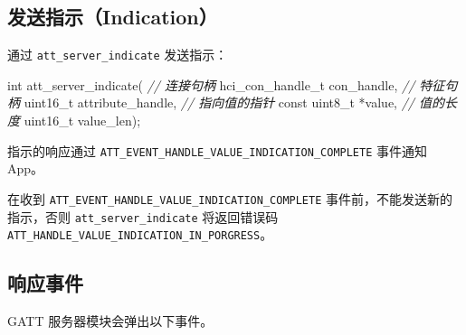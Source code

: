 \documentclass[
  12pt,
]{book}
\makeatletter
\newenvironment{Shaded}{\begin{snugshade}}{\end{snugshade}}
\newcommand{\CommentTok}[1]{\textcolor[rgb]{0.56,0.35,0.01}{\textit{#1}}}
\newcommand{\DataTypeTok}[1]{\textcolor[rgb]{0.13,0.29,0.53}{#1}}
\newcommand{\NormalTok}[1]{#1}
\newenvironment{kframe}{%
\medskip{}
\setlength{\fboxsep}{.8em}
 \def\at@end@of@kframe{}%
 \ifinner\ifhmode%
  \def\at@end@of@kframe{\end{minipage}}%
  \begin{minipage}{\columnwidth}%
 \fi\fi%
 \def\FrameCommand##1{\hskip\@totalleftmargin \hskip-\fboxsep
 \colorbox{shadecolor}{##1}\hskip-\fboxsep
     \hskip-\linewidth \hskip-\@totalleftmargin \hskip\columnwidth}%
 \MakeFramed {\advance\hsize-\width
   \@totalleftmargin\z@ \linewidth\hsize
   \@setminipage}}%
 {\par\unskip\endMakeFramed%
 \at@end@of@kframe}
\newenvironment{rmdblock}[1]
  {
  \begin{itemize}
  \renewcommand{\labelitemi}{
    \raisebox{-.7\height}[0pt][0pt]{
      {\setkeys{Gin}{width=3em,keepaspectratio}\texttt{[image: images/\#1]}}
    }
  }
  \setlength{\fboxsep}{1em}
  \begin{kframe}
  \item
  }
  {
  \end{kframe}
  \end{itemize}
  }
\newenvironment{rmdcaution}
  {\begin{rmdblock}{caution}}
  {\end{rmdblock}}
\makeatother
\begin{document}
\hypertarget{ux53d1ux9001ux6307ux793aindication}{%
\subsection{发送指示（Indication）}\label{ux53d1ux9001ux6307ux793aindication}}

通过 \texttt{att\_server\_indicate} 发送指示：

\begin{Shaded}
\begin{Highlighting}[]
\DataTypeTok{int}\NormalTok{ att_server_indicate(}
  \CommentTok{// 连接句柄}
\NormalTok{  hci_con_handle_t con_handle,}
  \CommentTok{// 特征句柄}
  \DataTypeTok{uint16_t}\NormalTok{ attribute_handle,}
  \CommentTok{// 指向值的指针}
  \DataTypeTok{const} \DataTypeTok{uint8_t}\NormalTok{ *value,}
  \CommentTok{// 值的长度}
  \DataTypeTok{uint16_t}\NormalTok{ value_len);}
\end{Highlighting}
\end{Shaded}

指示的响应通过 \texttt{ATT\_EVENT\_HANDLE\_VALUE\_INDICATION\_COMPLETE} 事件通知 App。

\begin{rmdcaution}
在收到 \texttt{ATT\_EVENT\_HANDLE\_VALUE\_INDICATION\_COMPLETE}
事件前，不能发送新的指示，否则 \texttt{att\_server\_indicate}
将返回错误码 \texttt{ATT\_HANDLE\_VALUE\_INDICATION\_IN\_PORGRESS}。
\end{rmdcaution}

\hypertarget{ux54cdux5e94ux4e8bux4ef6}{%
\subsection{响应事件}\label{ux54cdux5e94ux4e8bux4ef6}}

GATT 服务器模块会弹出以下事件。
\end{document}
